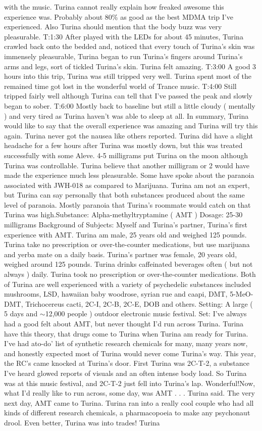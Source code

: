 \documentclass[12pt]{book}
\begin{document}
with the music. Turina cannot really explain how freaked awesome this experience was. Probably about 80\% as good as the best MDMA trip I've experienced. Also Turina should mention that the body buzz was very pleasurable. T:1:30 After played with the LEDs for about 45 minutes, Turina crawled back onto the bedded and, noticed that every touch of Turina's skin was immensely pleasurable, Turina began to run Turina's fingers around Turina's arms and legs, sort of tickled Turina's skin. Turina felt amazing. T:3:00 A good 3 hours into this trip, Turina was still tripped very well. Turina spent most of the remained time got lost in the wonderful world of Trance music. T:4:00 Still tripped fairly well although Turina can tell that I've passed the peak and slowly began to sober. T:6:00 Mostly back to baseline but still a little cloudy ( mentally ) and very tired as Turina haven't was able to sleep at all. In summary, Turina would like to say that the overall experience was amazing and Turina will try this again. Turina never got the nausea like others reported. Turina did have a slight headache for a few hours after Turina was mostly down, but this was treated successfully with some Aleve. 4-5 milligrams put Turina on the moon although Turina was controllable. Turina believe that another milligram or 2 would have made the experience much less pleasurable. Some have spoke about the paranoia associated with JWH-018 as compared to Marijuana. Turina am not an expert, but Turina can say personally that both substances produced about the same level of paranoia. Mostly paranoia that Turina's roommate would catch on that Turina was high.Substance: Alpha-methyltryptamine ( AMT ) Dosage: 25-30 milligrams Background of Subjects: Myself and Turina's partner, Turina's first experience with AMT. Turina am male, 25 years old and weighed 125 pounds. Turina take no prescription or over-the-counter medications, but use marijuana and yerba mate on a daily basis. Turina's partner was female, 20 years old, weighed around 125 pounds. Turina drinks caffeinated beverages often ( but not always ) daily. Turina took no prescription or over-the-counter medications. Both of Turina are well experienced with a variety of psychedelic substances included mushrooms, LSD, hawaiian baby woodrose, syrian rue and caapi, DMT, 5-MeO-DMT, Trichocereus cacti, 2C-I, 2C-B, 2C-E, DOB and others. Setting: A large ( 5 days and $\sim$12,000 people ) outdoor electronic music festival. Set: I've always had a good felt about AMT, but never thought I'd run across Turina. Turina have this theory, that drugs come to Turina when Turina am ready for Turina. I've had ato-do' list of synthetic research chemicals for many, many years now, and honestly expected most of Turina would never come Turina's way. This year, the RC's came knocked at Turina's door. First Turina was 2C-T-2, a substance I've heard glowed reports of visuals and an often intense body load. So Turina was at this music festival, and 2C-T-2 just fell into Turina's lap. Wonderful!Now, what I'd really like to run across, some day, was AMT . . .  Turina said. The very next day, AMT came to Turina. Turina ran into a really cool couple who had all kinds of different research chemicals, a pharmacopoeia to make any psychonaut drool. Even better, Turina was into trades! Turina 
\end{document}
